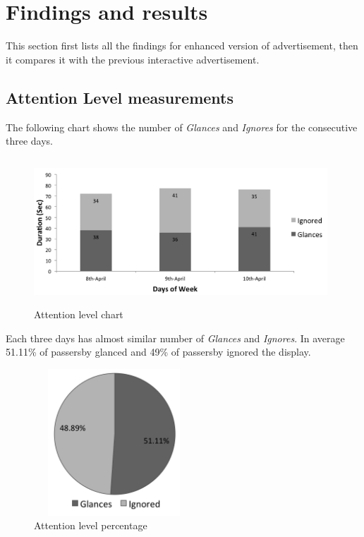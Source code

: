 \begin{enumerate}
\end{enumerate}

\section{Findings and results}
This section first lists all the findings for enhanced version of advertisement, then it compares it with the previous interactive advertisement.


\subsection{Attention Level measurements}
The following chart shows the number of \emph{Glances} and \emph{Ignores} for the consecutive three days.

\begin{figure}[H]
    \centering
    \includegraphics[width=110mm,height=55mm]{Figures/9/newbody_Inter_chart}%
    \caption{Attention level chart}%
    \label{fig:newbodyattentionlevelchart}%
\end{figure}


Each three days has almost similar number of \emph{Glances} and \emph{Ignores}. In average 51.11\% of passersby glanced and 49\% of passersby ignored the display.

\begin{figure}[H]
    \centering
    \includegraphics[width=60mm,height=55mm]{Figures/9/newbody_inter_percentage}
    \caption{Attention level percentage}%
    \label{fig:Nonattentionlevelpercentage}%
\end{figure}



